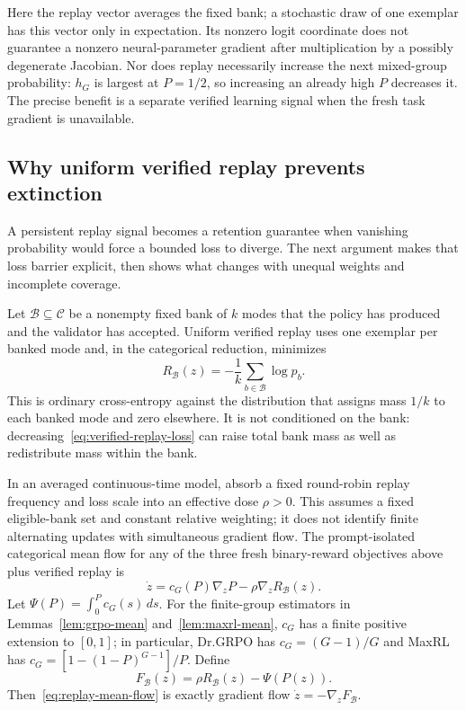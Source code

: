 Here the replay vector averages the fixed bank; a stochastic draw of one
exemplar has this vector only in expectation. Its nonzero logit coordinate
does not guarantee a nonzero neural-parameter gradient after multiplication
by a possibly degenerate Jacobian. Nor does replay necessarily increase the
next mixed-group probability: $h_G$ is largest at $P=1/2$, so increasing an
already high $P$ decreases it. The precise benefit is a separate verified
learning signal when the fresh task gradient is unavailable.

\subsection{Why uniform verified replay prevents extinction}
\label{app:theory-replay}

A persistent replay signal becomes a retention guarantee when vanishing
probability would force a bounded loss to diverge. The next argument makes
that loss barrier explicit, then shows what changes with unequal weights
and incomplete coverage.

Let $\mathcal B\subseteq\mathcal C$ be a nonempty fixed bank of $k$ modes that
the policy has produced and the validator has accepted. Uniform verified replay
uses one exemplar per banked mode and, in the categorical reduction, minimizes
\begin{equation}
  R_{\mathcal B}(z)
  =-\frac1k\sum_{b\in\mathcal B}\log p_b.
  \label{eq:verified-replay-loss}
\end{equation}
This is ordinary cross-entropy against the distribution that assigns mass
$1/k$ to each banked mode and zero elsewhere. It is not conditioned on the
bank: decreasing~\eqref{eq:verified-replay-loss} can raise total bank mass as
well as redistribute mass within the bank.

In an averaged continuous-time model, absorb a fixed round-robin replay
frequency and loss scale into an effective dose $\rho>0$. This assumes a
fixed eligible-bank set and constant relative weighting; it does not identify
finite alternating updates with simultaneous gradient flow. The prompt-isolated categorical mean flow for any of the three fresh
binary-reward objectives above plus verified replay is
\begin{equation}
  \dot z
  =c_G(P)\nabla_zP-\rho\nabla_zR_{\mathcal B}(z).
  \label{eq:replay-mean-flow}
\end{equation}
Let $\Psi(P)=\int_0^P c_G(s)\,ds$. For the finite-group estimators in Lemmas~\ref{lem:grpo-mean}
and~\ref{lem:maxrl-mean}, $c_G$ has a finite positive extension to $[0,1]$;
in particular, Dr.GRPO has $c_G=(G-1)/G$ and MaxRL has
$c_G=[1-(1-P)^{G-1}]/P$. Define
\begin{equation}
  F_{\mathcal B}(z)=\rho R_{\mathcal B}(z)-\Psi(P(z)).
  \label{eq:replay-potential}
\end{equation}
Then~\eqref{eq:replay-mean-flow} is exactly gradient flow
$\dot z=-\nabla_zF_{\mathcal B}$.

